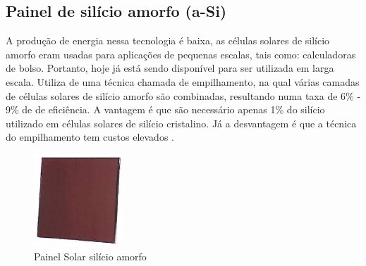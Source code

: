 \subsection{Painel de silício amorfo (a-Si)}

A produção de energia nessa tecnologia é baixa, as células solares de silício amorfo eram usadas para aplicações de pequenas escalas, tais como: calculadoras de bolso. Portanto, hoje já está sendo disponível para ser utilizada em larga escala.  Utiliza de uma técnica chamada de empilhamento, na qual várias camadas de células solares de silício amorfo são combinadas, resultando numa taxa de 6\% - 9\% de de eficiência. A vantagem é que são necessário apenas 1\% do silício utilizado em células solares de silício cristalino. Já a desvantagem é que a técnica do empilhamento tem custos elevados \cite{neosolar}.

\begin{figure}[!h]
\centering
\includegraphics[width=0.3\textwidth]{figuras/marrom.png}
\caption{Painel Solar silício amorfo}
\label{fig:marrom}
\end{figure}